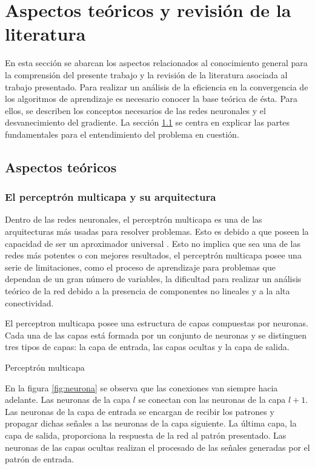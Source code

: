 \chapter{Aspectos teóricos y revisión de la literatura}
En esta sección se abarcan los aspectos relacionados al conocimiento general para la comprensión del presente trabajo y la revisión de la literatura asociada al trabajo presentado. Para realizar un análisis de la eficiencia en la convergencia de los algoritmos de aprendizaje es necesario conocer la base teórica de ésta. Para ellos, se describen los conceptos necesarios de las redes neuronales y el desvanecimiento del gradiente. La sección \ref{sec:aspectos_teoricos} se centra en explicar las partes fundamentales para el entendimiento del problema en cuestión.

\section{Aspectos teóricos}\label{sec:aspectos_teoricos}
\subsection{El perceptrón multicapa y su arquitectura}
Dentro de las redes neuronales, el perceptrón multicapa es una de las arquitecturas más usadas para resolver problemas. Esto es debido a que poseen la capacidad de ser un aproximador universal \cite{Minsky1969b}. Esto no implica que sea una de las redes más potentes o con mejores resultados, el perceptrón multicapa posee una serie de limitaciones, como el proceso de aprendizaje para problemas que dependan de un gran número de variables, la dificultad para realizar un análisis teórico de la red debido a la presencia de componentes no lineales y a la alta conectividad.

El perceptron multicapa posee una estructura de capas compuestas por neuronas. Cada una de las capas está formada por un conjunto de neuronas y se distinguen tres tipos de capas: la capa de entrada, las capas ocultas y la capa de salida.

\begin{imagen}
	\scalebox{0.8}{}
	\caption{Perceptrón multicapa}
	\label{fig:neurona}
\end{imagen}

En la figura \ref{fig:neurona} se observa que las conexiones van siempre hacia adelante. Las neuronas de la capa $l$ se conectan con las neuronas de la capa $l + 1$. Las neuronas de la capa de entrada se encargan de recibir los patrones y propagar dichas señales a las neuronas de la capa siguiente. La última capa, la capa de salida, proporciona la respuesta de la red al patrón presentado. Las neuronas de las capas ocultas realizan el procesado de las señales generadas por el patrón de entrada.

